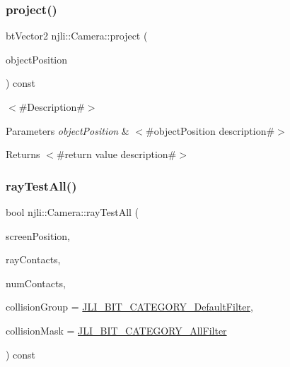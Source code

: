 \mbox{\label{classnjli_1_1_camera_a5cb19ed6cae871c33120f5a8662d04a7}} 
\subsubsection{\texorpdfstring{project()}{project()}}
{\footnotesize\ttfamily bt\+Vector2 njli\+::\+Camera\+::project (\begin{DoxyParamCaption}\item[{const bt\+Vector3 \&}]{object\+Position }\end{DoxyParamCaption}) const}

$<$\#\+Description\#$>$


\begin{DoxyParams}{Parameters}
{\em object\+Position} & $<$\#object\+Position description\#$>$\\
\hline
\end{DoxyParams}
\begin{DoxyReturn}{Returns}
$<$\#return value description\#$>$ 
\end{DoxyReturn}
\mbox{\label{classnjli_1_1_camera_a88cb37e1d85fdfa9b20601880c73b335}} 
\subsubsection{\texorpdfstring{ray\+Test\+All()}{rayTestAll()}}
{\footnotesize\ttfamily bool njli\+::\+Camera\+::ray\+Test\+All (\begin{DoxyParamCaption}\item[{const bt\+Vector2 \&}]{screen\+Position,  }\item[{bt\+Aligned\+Object\+Array$<$ \mbox{\hyperlink{classnjli_1_1_physics_ray_contact}{Physics\+Ray\+Contact}} $\ast$$>$ \&}]{ray\+Contacts,  }\item[{\mbox{\hyperlink{_util_8h_aa62c75d314a0d1f37f79c4b73b2292e2}{s32}} \&}]{num\+Contacts,  }\item[{\mbox{\hyperlink{namespacenjli_af7b302a2b48bb644f85c88080925c974}{njli\+Bit\+Categories}}}]{collision\+Group = {\ttfamily \mbox{\hyperlink{namespacenjli_af7b302a2b48bb644f85c88080925c974a53b33337014e199f56e752574f36981e}{J\+L\+I\+\_\+\+B\+I\+T\+\_\+\+C\+A\+T\+E\+G\+O\+R\+Y\+\_\+\+Default\+Filter}}},  }\item[{\mbox{\hyperlink{namespacenjli_af7b302a2b48bb644f85c88080925c974}{njli\+Bit\+Categories}}}]{collision\+Mask = {\ttfamily \mbox{\hyperlink{namespacenjli_af7b302a2b48bb644f85c88080925c974a0fba80cad161dda96de5cbda9091cdce}{J\+L\+I\+\_\+\+B\+I\+T\+\_\+\+C\+A\+T\+E\+G\+O\+R\+Y\+\_\+\+All\+Filter}}} }\end{DoxyParamCaption}) const}

